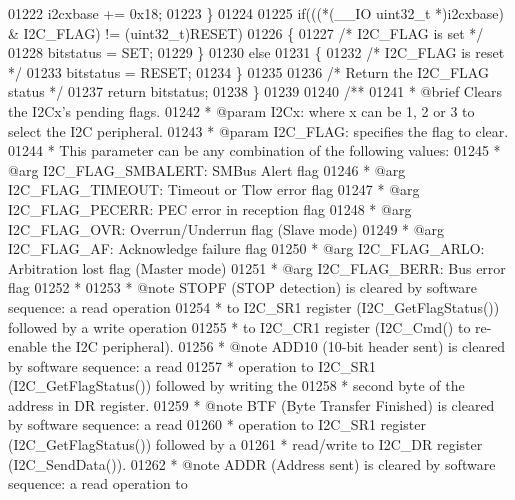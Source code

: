 \begin{DoxyCode}
01222     i2cxbase += 0x18;
01223   \}
01224 
01225   \textcolor{keywordflow}{if}(((*(\_\_IO uint32\_t *)i2cxbase) & I2C\_FLAG) != (uint32\_t)RESET)
01226   \{
01227     \textcolor{comment}{/* I2C\_FLAG is set */}
01228     bitstatus = SET;
01229   \}
01230   \textcolor{keywordflow}{else}
01231   \{
01232     \textcolor{comment}{/* I2C\_FLAG is reset */}
01233     bitstatus = RESET;
01234   \}
01235 
01236   \textcolor{comment}{/* Return the I2C\_FLAG status */}
01237   \textcolor{keywordflow}{return}  bitstatus;
01238 \}
01239 
01240 \textcolor{comment}{/**}
01241 \textcolor{comment}{  * @brief  Clears the I2Cx's pending flags.}
01242 \textcolor{comment}{  * @param  I2Cx: where x can be 1, 2 or 3 to select the I2C peripheral.}
01243 \textcolor{comment}{  * @param  I2C\_FLAG: specifies the flag to clear. }
01244 \textcolor{comment}{  *          This parameter can be any combination of the following values:}
01245 \textcolor{comment}{  *            @arg I2C\_FLAG\_SMBALERT: SMBus Alert flag}
01246 \textcolor{comment}{  *            @arg I2C\_FLAG\_TIMEOUT: Timeout or Tlow error flag}
01247 \textcolor{comment}{  *            @arg I2C\_FLAG\_PECERR: PEC error in reception flag}
01248 \textcolor{comment}{  *            @arg I2C\_FLAG\_OVR: Overrun/Underrun flag (Slave mode)}
01249 \textcolor{comment}{  *            @arg I2C\_FLAG\_AF: Acknowledge failure flag}
01250 \textcolor{comment}{  *            @arg I2C\_FLAG\_ARLO: Arbitration lost flag (Master mode)}
01251 \textcolor{comment}{  *            @arg I2C\_FLAG\_BERR: Bus error flag}
01252 \textcolor{comment}{  *   }
01253 \textcolor{comment}{  * @note   STOPF (STOP detection) is cleared by software sequence: a read operation }
01254 \textcolor{comment}{  *          to I2C\_SR1 register (I2C\_GetFlagStatus()) followed by a write operation }
01255 \textcolor{comment}{  *          to I2C\_CR1 register (I2C\_Cmd() to re-enable the I2C peripheral).}
01256 \textcolor{comment}{  * @note   ADD10 (10-bit header sent) is cleared by software sequence: a read }
01257 \textcolor{comment}{  *          operation to I2C\_SR1 (I2C\_GetFlagStatus()) followed by writing the }
01258 \textcolor{comment}{  *          second byte of the address in DR register.}
01259 \textcolor{comment}{  * @note   BTF (Byte Transfer Finished) is cleared by software sequence: a read }
01260 \textcolor{comment}{  *          operation to I2C\_SR1 register (I2C\_GetFlagStatus()) followed by a }
01261 \textcolor{comment}{  *          read/write to I2C\_DR register (I2C\_SendData()).}
01262 \textcolor{comment}{  * @note   ADDR (Address sent) is cleared by software sequence: a read operation to }

\end{DoxyCode}
